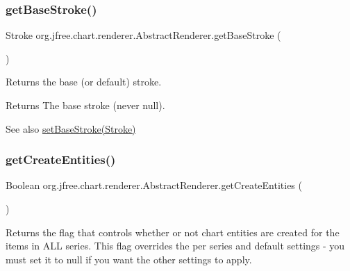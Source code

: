 \subsubsection{\texorpdfstring{get\+Base\+Stroke()}{getBaseStroke()}}
{\footnotesize\ttfamily Stroke org.\+jfree.\+chart.\+renderer.\+Abstract\+Renderer.\+get\+Base\+Stroke (\begin{DoxyParamCaption}{ }\end{DoxyParamCaption})}

Returns the base (or default) stroke.

\begin{DoxyReturn}{Returns}
The base stroke (never {\ttfamily null}).
\end{DoxyReturn}
\begin{DoxySeeAlso}{See also}
\mbox{\hyperlink{classorg_1_1jfree_1_1chart_1_1renderer_1_1_abstract_renderer_a33600c32414c464c6394827d61f9b374}{set\+Base\+Stroke(\+Stroke)}} 
\end{DoxySeeAlso}
\mbox{\label{classorg_1_1jfree_1_1chart_1_1renderer_1_1_abstract_renderer_a605f6ec57d4870fdfbd9e15b49e7c1c0}} 
\subsubsection{\texorpdfstring{get\+Create\+Entities()}{getCreateEntities()}}
{\footnotesize\ttfamily Boolean org.\+jfree.\+chart.\+renderer.\+Abstract\+Renderer.\+get\+Create\+Entities (\begin{DoxyParamCaption}{ }\end{DoxyParamCaption})}

Returns the flag that controls whether or not chart entities are created for the items in A\+LL series. This flag overrides the per series and default settings -\/ you must set it to {\ttfamily null} if you want the other settings to apply.

